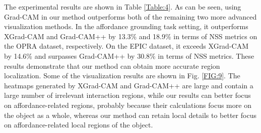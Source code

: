 \documentclass[journal,twoside]{IEEEtran}
\begin{document}
The experimental results are shown in Table \ref{Table:4}. As can be seen, using Grad-CAM in our method outperforms both of the remaining two more advanced visualization methods. In the affordance grounding task setting, it outperforms XGrad-CAM \cite{fu2020axiom} and Grad-CAM++ \cite{chattopadhay2018grad} by 13.3\% and 18.9\% in terms of NSS \cite{peters2005components} metrics on the OPRA \cite{demo2vec2018cvpr} dataset, respectively. On the EPIC \cite{Damen2018EPICKITCHENS} dataset, it exceeds XGrad-CAM by 14.6\% and surpasses Grad-CAM++ by 30.8\% in terms of NSS metrics. These results demonstrate that our method can obtain more accurate region localization. Some of the visualization results are shown in Fig. \ref{FIG:9}. The heatmaps generated by XGrad-CAM and Grad-CAM++ are large and contain a large number of irrelevant interaction regions, while our results can better focus on affordance-related regions, probably because their calculations focus more on the object as a whole, whereas our method can retain local details to better focus on affordance-related local regions of the object.
\end{document}
